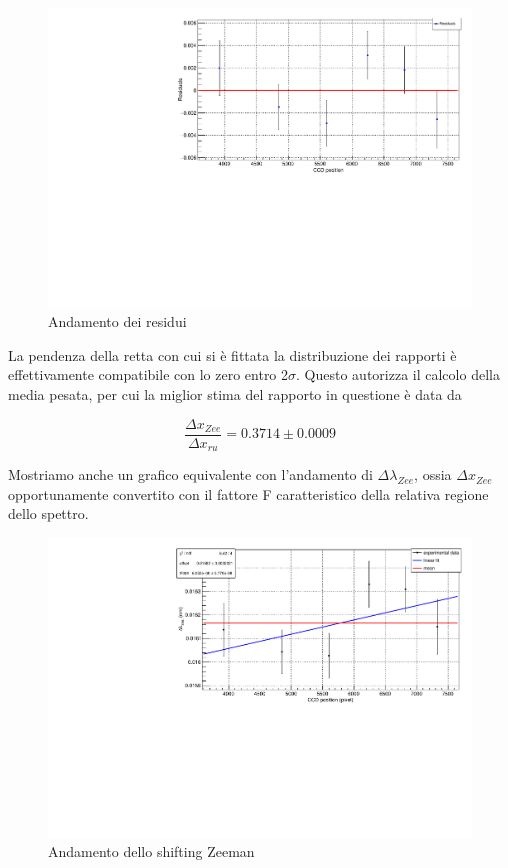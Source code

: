 \documentclass{article}
\begin{document}
	\begin{center}
		\begin{figure}[H]
			\centering
			\includegraphics[scale=0.38, angle=0]{campomax/residuals.pdf}
			\caption{Andamento dei residui}
			\label{fig:fit_rapporto_res}
		\end{figure}
	\end{center}

	La pendenza della retta con cui si è fittata la distribuzione dei rapporti è effettivamente
	compatibile con lo zero entro 2$\sigma$. Questo autorizza il calcolo della media pesata, per cui 
	la miglior stima del rapporto in questione è data da 

	\[
		\frac{\Delta x_{Zee}}{\Delta x_{ru}} = 0.3714 \pm 0.0009	
	\]

	Mostriamo anche un grafico equivalente con l'andamento di $\Delta\lambda_{Zee}$, ossia 
	$\Delta x_{Zee}$ opportunamente convertito con il fattore F caratteristico della relativa regione
	dello spettro.

	\begin{center}
		\begin{figure}[H]
			\centering
			\includegraphics[scale=0.38, angle=0]{campomax/dlambdazee.pdf}
			\caption{Andamento dello shifting Zeeman}
			\label{fig:fit_dlambdazee}
		\end{figure}
	\end{center}
\end{document}
